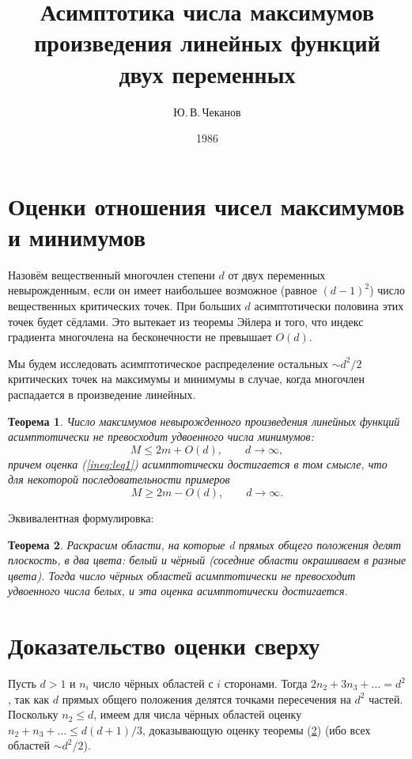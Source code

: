\documentclass[a4paper,12pt]{article}
\title{Асимптотика числа максимумов произведения линейных функций двух переменных}
\author{Ю.\,В.\,Чеканов}
\date{1986}
\newtheorem{law}{Теорема}
\begin{document}
\maketitle

\section{Оценки отношения чисел максимумов и минимумов}
  Назовём вещественный многочлен степени \(d\) от двух переменных невырожденным, если он имеет наибольшее возможное (равное \((d-1)^2\)) число вещественных критических точек. При больших \(d\) асимптотически половина этих точек будет сёдлами. Это вытекает из теоремы Эйлера и того, что индекс градиента многочлена на бесконечности не превышает \(O(d)\).

  Мы будем исследовать асимптотическое распределение остальных \mbox{\(\sim d^2/2\)} критических точек на максимумы и минимумы в случае, когда многочлен распадается в произведение линейных.

  \begin{law}
    \label{law:th1}
    Число максимумов невырожденного произведения линейных функций асимптотически не превосходит удвоенного числа минимумов:
    \begin{equation}
      \label{ineq:leq1}
      M \leqslant 2m + O(d),\qquad d \to \infty,
    \end{equation}
    причем оценка (\ref{ineq:leq1}) асимптотически достигается в том смысле, что для некоторой последовательности примеров
    \begin{equation}
      \label{ineq:leq2}
      M \geqslant 2m - O(d),\qquad d \to \infty.
    \end{equation}
  \end{law}

  Эквивалентная формулировка:

  \begin{law}
    \label{law:th2}
    Раскрасим области, на которые d прямых общего положения делят плоскость, в два цвета: белый и чёрный (соседние области окрашиваем в разные цвета). Тогда число чёрных областей асимптотически не превосходит удвоенного числа белых, и эта оценка асимптотически достигается.
  \end{law}

\section{Доказательство оценки сверху}
  Пусть \(d > 1\) и \(n_i\) число чёрных областей с \(i\) сторонами. Тогда \(2n_2+3n_3+\ldots=d^2\), так как \(d\) прямых общего положения делятся точками пересечения на \(d^2\) частей. Поскольку \(n_2 \leqslant d\), имеем для числа чёрных областей оценку \(n_2 + n_3 + \ldots \leqslant d(d+1)/3\), доказывающую оценку теоремы (\ref{law:th2}) (ибо всех областей \mbox{\(\sim d^2/2\)}).
\end{document}
